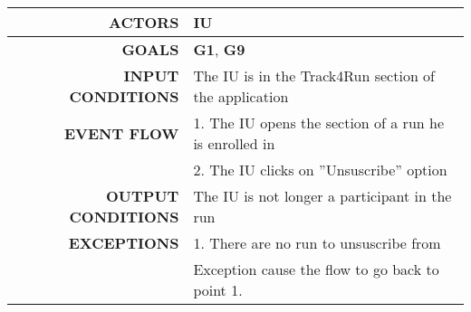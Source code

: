 \begin{table}[h!]
\begin{tabular}{|r|p{3in}|}
\hline
\textbf{ACTORS} & IU\\
\hline
\textbf{GOALS} & \textbf{G1},  \textbf{G9} \\
\hline
\textbf{INPUT CONDITIONS} & The IU is in the Track4Run section of the application\\
\hline
\textbf{EVENT FLOW} 
&1. The IU opens the section of a run he is enrolled in \\
&2. The IU clicks on ''Unsuscribe'' option\\
\hline
\textbf{OUTPUT CONDITIONS} & The IU is not longer a participant in the run\\
\hline
\textbf{EXCEPTIONS} 
&1. There are no run to unsuscribe from\\
&Exception cause the flow to go back to point 1.\\
\hline
\end{tabular}
\end{table}